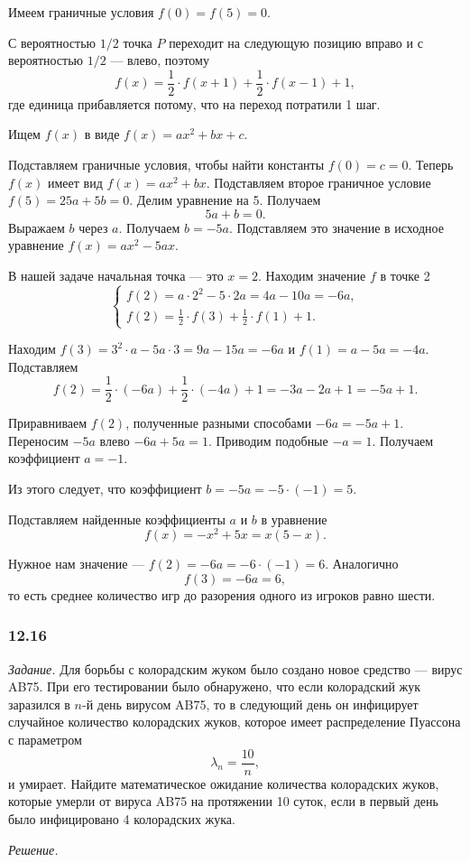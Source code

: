 Имеем граничные условия $f \left( 0 \right) = f \left( 5 \right) = 0$.

С вероятностью $1/2$ точка $P$  переходит на следующую позицию вправо и с вероятностью $1/2$ --- влево, поэтому
$$f \left( x \right) =
\frac{1}{2} \cdot f \left( x+1 \right) + \frac{1}{2} \cdot f \left( x-1 \right) +1,$$
где единица прибавляется потому, что на переход потратили 1 шаг.

Ищем $f \left( x \right) $ в виде $f \left( x \right) = ax^2 + bx + c$.

Подставляем граничные условия, чтобы найти константы $f \left( 0 \right) = c = 0$.
Теперь $f \left( x \right) $ имеет вид $f \left( x \right) = ax^2 + bx$.
Подставляем второе граничное условие $f \left( 5 \right) = 25a + 5b = 0$.
Делим уравнение на 5.
Получаем
$$5a + b =
0.$$
Выражаем $b$ через $a$.
Получаем $b = -5a$.
Подставляем это значение в исходное уравнение $f \left( x \right) = ax^2 - 5ax$.

В нашей задаче начальная точка --- это $x = 2$.
Находим значение $f$ в точке 2
$$ \begin{cases}
f \left( 2 \right) = a \cdot 2^2 - 5 \cdot 2 a = 4a - 10a = -6a, \\
f \left( 2 \right) = \frac{1}{2} \cdot f \left( 3 \right) + \frac{1}{2} \cdot f \left( 1 \right) + 1. 
\end{cases}$$

Находим $f \left( 3 \right) = 3^2 \cdot a - 5 a \cdot 3 = 9a - 15a = -6a$ и $f \left( 1 \right) = a - 5a = -4a$.
Подставляем
$$f \left( 2 \right) =
\frac{1}{2} \cdot \left( -6a \right) + \frac{1}{2} \cdot \left( -4a \right) + 1 =
-3a - 2a + 1 =
-5a + 1.$$

Приравниваем $f \left( 2 \right) $, полученные разными способами $-6a = -5a + 1$.
Переносим $-5a$ влево $-6a + 5a = 1$.
Приводим подобные $-a = 1$.
Получаем коэффициент $a = -1$.

Из этого следует, что коэффициент $b = -5a = -5 \cdot \left( -1 \right) = 5$.

Подставляем найденные коэффициенты $a$ и $b$ в уравнение
$$f \left( x \right) =
-x^2 + 5x =
x \left( 5 - x \right).$$

Нужное нам значение --- $f \left( 2 \right) = -6a = -6 \cdot \left( -1 \right) = 6$.
Аналогично
$$f \left( 3 \right) =
-6a =
6,$$
то есть среднее количество игр до разорения одного из игроков равно шести.

\subsubsection*{12.16}

\textit{Задание.} Для борьбы с колорадским жуком было создано новое средство --- вирус AB75.
При его тестировании было обнаружено,
что если колорадский жук заразился в $n$-й день вирусом AB75,
то в следующий день он инфицирует случайное количество колорадских жуков, которое имеет распределение Пуассона с параметром
$$ \lambda_n =
\frac{10}{n},$$
и умирает.
Найдите математическое ожидание количества колорадских жуков,
которые умерли от вируса AB75 на протяжении 10 суток, если в первый день было инфицировано 4 колорадских жука.

\textit{Решение.}
